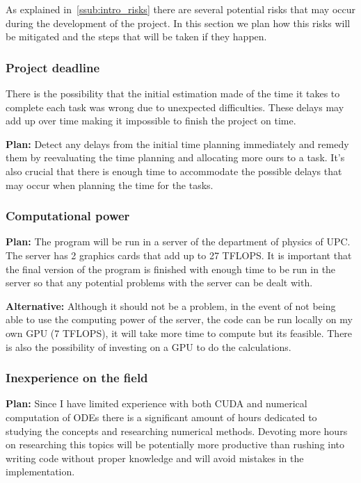 As explained in~\cref{ssub:intro_risks} there are several potential risks that
may occur during the development of the project. In this section we plan how
this risks will be mitigated and the steps that will be taken if they happen.

    \subsubsection{Project deadline}
    There is the possibility that the initial estimation made of the time it
    takes to complete each task was wrong due to unexpected difficulties. These
    delays may add up over time making it impossible to finish the project on
    time.

    \textbf{Plan:} Detect any delays from the initial time planning immediately
    and remedy them by reevaluating the time planning and allocating more ours
    to a task. It's also crucial that there is enough time to accommodate the
    possible delays that may occur when planning the time for the tasks.

    \subsubsection{Computational power}
    \textbf{Plan:} The program will be run in a server of the department of
    physics of UPC.  The server has 2 graphics cards that add up to 27 TFLOPS.
    It is important that the final version of the program is finished with
    enough time to be run in the server so that any potential problems with the
    server can be dealt with.

    \textbf{Alternative:} Although it should not be a problem, in the event of
    not being able to use the computing power of the server, the code can be run
    locally on my own GPU (7 TFLOPS), it will take more time to compute but its
    feasible. There is also the possibility of investing on a GPU to do the
    calculations.

    \subsubsection{Inexperience on the field}%
    \label{ssub:inexp}
    \textbf{Plan:} Since I have limited experience with both CUDA and numerical
    computation of ODEs there is a significant amount of hours dedicated to
    studying the concepts and researching numerical methods. Devoting more hours
    on researching this topics will be potentially more productive than rushing
    into writing code without proper knowledge and will avoid mistakes in the
    implementation.
